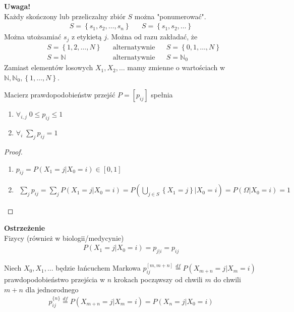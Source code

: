 \textbf{Uwaga!}\\
Każdy skończony lub przeliczalny zbiór $ S $ można "ponumerować".
\begin{align*}
S=\left\{s_1,s_2,\dots,s_n\right\}
&&
S=\left\{s_1,s_2,\dots\right\}
\end{align*}
Można utożsamiać $ s_j $ z etykietą $ j $. Można od razu zakładać, że
\begin{align*}
&S=\left\{1,2,\dots,N\right\}
&&
\text{alternatywnie}
&&
S=\left\{0,1,\dots,N\right\}\\
&S=\mathbb N 
&&
\text{alternatywnie}
&&
S=\mathbb N _0
\end{align*}
Zamiast elementów losowych $ X_1,X_2,\dots$ mamy zmienne o wartościach w \\$ \mathbb N ,\mathbb N _0,\left\{1,\dots,N\right\} $.
\begin{lem}
Macierz prawdopodobieństw przejść $ P=\left[p_{ij}\right] $ spełnia
\begin{enumerate}
\item $ \forall_{i,j}\;0\le p_{ij}\le 1 $
\item $ \forall_{i}\; \sum_j p_{ij}=1 $
\end{enumerate}
\begin{proof}$  $
\begin{enumerate}
\item $ p_{ij}=P\left(X_1=j|X_0=i\right)\in[0,1] $
\item 
\begin{gather*}
\sum_j p_{ij}=
\sum_j P\left(X_1=j|X_0=i\right)=
P\left(\bigcup_{j\in S}\left\{X_1=j\right\}|X_0=i\right)=
P\left(\Omega|X_0=i\right)=1
\end{gather*}
\end{enumerate}
\end{proof}
\end{lem}
\textbf{Ostrzeżenie}\\
Fizycy (również w biologii/medycynie)
\begin{gather*}
P\left(X_1=j|X_0=i\right)=p_{j|i}=p_{ij}
\end{gather*}
\begin{defi}
Niech $ X_0,X_1,\dots  $ będzie łańcuchem Markowa $ p_{ij}^{[m,m+n]}\stackrel{df}{=}P\left(X_{m+n}=j|X_m=i\right) $ prawdopodobieństwo przejścia w $ n $ krokach począwszy od chwili $ m $ do chwili $ m+n $ dla jednorodnego
\begin{gather*}
p_{ij}^{\{n\}}\stackrel{df}{=}
P\left(X_{m+n}=j|X_m=i\right)=
P\left(X_{n}=j|X_0=i\right)
\end{gather*}
\end{defi}
